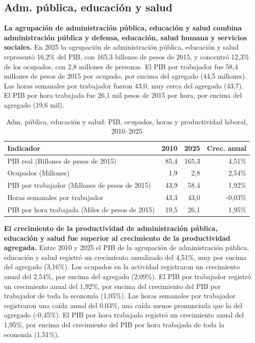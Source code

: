\subsection{Adm. pública, educación y salud}

\textbf{La agrupación de administración pública, educación y salud combina administración pública y defensa, educación, salud humana y servicios sociales.} En 2025 la agrupación de administración pública, educación y salud representó 16,2\% del PIB, con 165,3 billones de pesos de 2015, y concentró 12,3\% de los ocupados, con 2,8 millones de personas. El PIB por trabajador fue 58,4 millones de pesos de 2015 por ocupado, por encima del agregado (44,5 millones). Las horas semanales por trabajador fueron 43,0, muy cerca del agregado (43,7). El PIB por hora trabajada fue 26,1 mil pesos de 2015 por hora, por encima del agregado (19,6 mil).

\begin{table}[H]
\centering
\caption{Adm. pública, educación y salud: PIB, ocupados, horas y productividad laboral, 2010--2025}
\label{tab:sector_o_p_q_productividad}
\small
\begin{tabular}{lrrr}
\toprule
Indicador & 2010 & 2025 & Crec. anual \\
\midrule
PIB real  (Billones de pesos de 2015) & 85,4 & 165,3 & 4,51\% \\
Ocupados (Millones) & 1,9 & 2,8 & 2,54\% \\
PIB por trabajador (Millones de pesos de 2015) & 43,9 & 58,4 & 1,92\% \\
Horas semanales por trabajador & 43,3 & 43,0 & -0,03\% \\
PIB por hora trabajada (Miles de pesos de 2015) & 19,5 & 26,1 & 1,95\% \\
\bottomrule
\end{tabular}
\end{table}

\textbf{El crecimiento de la productividad de administración pública, educación y salud fue superior al crecimiento de la productividad agregada.} Entre 2010 y 2025 el PIB de la agrupación de administración pública, educación y salud registró un crecimiento anualizado del 4,51\%, muy por encima del agregado (3,16\%). Los ocupados en la actividad registraron un crecimiento anual del 2,54\%, por encima del agregado (2,09\%). El PIB por trabajador registró un crecimiento anual del 1,92\%, por encima del crecimiento del PIB por trabajador de toda la economía (1,05\%). Las horas semanales por trabajador registraron una caída anual del 0,03\%, una caída menos pronunciada que la del agregado (-0,45\%). El PIB por hora trabajada registró un crecimiento anual del 1,95\%, por encima del crecimiento del PIB por hora trabajada de toda la economía (1,51\%).


